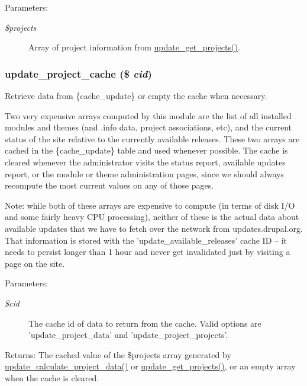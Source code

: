 \begin{Desc}
\item[Parameters:]
\begin{description}
\item[{\em \$projects}]Array of project information from \hyperlink{update_8compare_8inc_7e1ea49d91f2d2b81b8101d481d10300}{update\_\-get\_\-projects()}. \end{description}
\end{Desc}
\hypertarget{update_8compare_8inc_958705ecce49b020722280decff3f644}{
\subsubsection[{update\_\-project\_\-cache}]{\setlength{\rightskip}{0pt plus 5cm}update\_\-project\_\-cache (\$ {\em cid})}}
\label{update_8compare_8inc_958705ecce49b020722280decff3f644}


Retrieve data from \{cache\_\-update\} or empty the cache when necessary.

Two very expensive arrays computed by this module are the list of all installed modules and themes (and .info data, project associations, etc), and the current status of the site relative to the currently available releases. These two arrays are cached in the \{cache\_\-update\} table and used whenever possible. The cache is cleared whenever the administrator visits the status report, available updates report, or the module or theme administration pages, since we should always recompute the most current values on any of those pages.

Note: while both of these arrays are expensive to compute (in terms of disk I/O and some fairly heavy CPU processing), neither of these is the actual data about available updates that we have to fetch over the network from updates.drupal.org. That information is stored with the 'update\_\-available\_\-releases' cache ID -- it needs to persist longer than 1 hour and never get invalidated just by visiting a page on the site.

\begin{Desc}
\item[Parameters:]
\begin{description}
\item[{\em \$cid}]The cache id of data to return from the cache. Valid options are 'update\_\-project\_\-data' and 'update\_\-project\_\-projects'.\end{description}
\end{Desc}
\begin{Desc}
\item[Returns:]The cached value of the \$projects array generated by \hyperlink{update_8compare_8inc_a0663304dc4634e4109c896f214ea791}{update\_\-calculate\_\-project\_\-data()} or \hyperlink{update_8compare_8inc_7e1ea49d91f2d2b81b8101d481d10300}{update\_\-get\_\-projects()}, or an empty array when the cache is cleared. \end{Desc}

